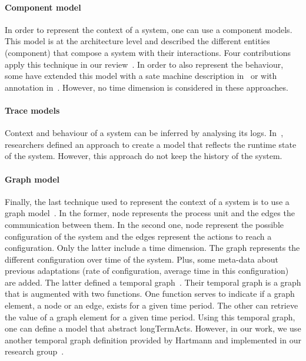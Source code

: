 \paragraph{Component model}
In order to represent the context of a system, one can use a component models.
This model is at the architecture level and described the different entities (component) that compose a system with their interactions.
Four contributions apply this technique in our review~\cite{DBLP:conf/soco/DavidL06, DBLP:conf/wetice/DjoudiBZ14, DBLP:journals/computer/GarlanCHSS04, DBLP:conf/cbse/FouquetMFBPJ12}.
In order to also represent the behaviour, some have extended this model with a sate machine description in~\cite{DBLP:conf/wetice/DjoudiBZ14} or with annotation in~\cite{DBLP:journals/computer/GarlanCHSS04}.
However, no time dimension is considered in these approaches.

\paragraph{Trace models}
Context and behaviour of a system can be inferred by analysing its logs.
In~\cite{DBLP:journals/computer/Maoz09}, researchers defined an approach to create a model that reflects the runtime state of the system.
However, this approach do not keep the history of the system.
	
\paragraph{Graph model}
Finally, the last technique used to represent the context of a system is to use a graph model~\cite{DBLP:journals/tse/KramerM90, DBLP:journals/computer/GeorgasHT09, DBLP:conf/dbpl/MoffittS17}.
In the former, node represents the process unit and the edges the communication between them.
In the second one, node represent the possible configuration of the system and the edges represent the actions to reach a configuration.
Only the latter include a time dimension.
The graph represents the different configuration over time of the system.
Plus, some meta-data about previous adaptations (\eg rate of configuration, average time in this configuration) are added.
The latter defined a temporal graph~\cite{DBLP:conf/dbpl/MoffittS17}.
Their temporal graph is a graph that is augmented with two functions.
One function serves to indicate if a graph element, a node or an edge, exists for a given time period.
The other can retrieve the value of a graph element for a given time period.
Using this temporal graph, one can define a model that abstract \glspl{longTermAct}.
However, in our work, we use another temporal graph definition provided by Hartmann \etal and implemented in our research group~\cite{DBLP:journals/is/HartmannFMRT19}.

